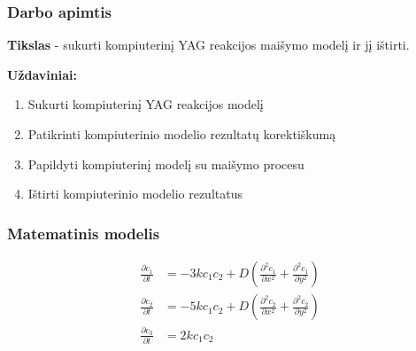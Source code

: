 \documentclass{beamer}
\begin{document}
\begin{frame}
\frametitle{Darbo apimtis}
\textbf{Tikslas} - sukurti kompiuterinį YAG reakcijos maišymo modelį ir jį ištirti.

\textbf{Uždaviniai:}
\begin{enumerate}
\item Sukurti kompiuterinį YAG reakcijos modelį
\item Patikrinti kompiuterinio modelio rezultatų korektiškumą
\item Papildyti kompiuterinį modelį su maišymo procesu
\item Ištirti kompiuterinio modelio rezultatus
\end{enumerate}

\end{frame}

\begin{frame}
\frametitle{Matematinis modelis}

\begin{align*}
    \frac{\partial c_1}{\partial t} & =-3kc_1c_2+D\left(\frac{\partial^2c_1}{\partial x^2}+\frac{\partial^2c_1}{\partial y^2}\right) \\
    \frac{\partial c_2}{\partial t} & =-5kc_1c_2+D\left(\frac{\partial^2c_2}{\partial x^2}+\frac{\partial^2c_2}{\partial y^2}\right)\\
    \frac{\partial c_3}{\partial t} & =2kc_1c_2
\end{align*}

\end{frame}
\end{document}
